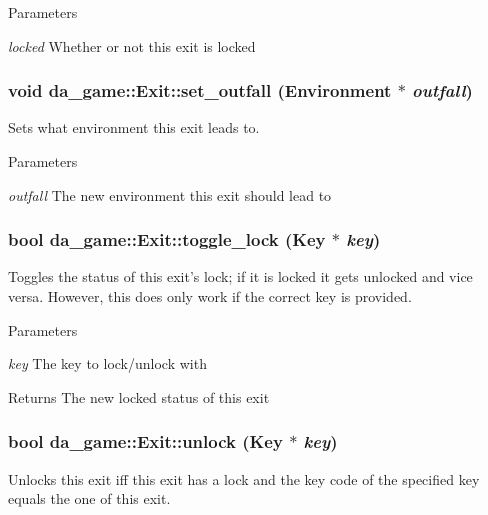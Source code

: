 \begin{DoxyParams}{Parameters}
\item[{\em locked}]Whether or not this exit is locked \end{DoxyParams}
\hypertarget{classda__game_1_1Exit_ae4f9caa0ac7bf7e09ae1b32fd3f10719}{
\subsubsection[{set\_\-outfall}]{\setlength{\rightskip}{0pt plus 5cm}void da\_\-game::Exit::set\_\-outfall ({\bf Environment} $\ast$ {\em outfall})}}
\label{classda__game_1_1Exit_ae4f9caa0ac7bf7e09ae1b32fd3f10719}
Sets what environment this exit leads to.


\begin{DoxyParams}{Parameters}
\item[{\em outfall}]The new environment this exit should lead to \end{DoxyParams}
\hypertarget{classda__game_1_1Exit_a36b7a9235fcb00bf2be0b3fbc5817310}{
\subsubsection[{toggle\_\-lock}]{\setlength{\rightskip}{0pt plus 5cm}bool da\_\-game::Exit::toggle\_\-lock ({\bf Key} $\ast$ {\em key})}}
\label{classda__game_1_1Exit_a36b7a9235fcb00bf2be0b3fbc5817310}
Toggles the status of this exit's lock; if it is locked it gets unlocked and vice versa. However, this does only work if the correct key is provided.


\begin{DoxyParams}{Parameters}
\item[{\em key}]The key to lock/unlock with \end{DoxyParams}
\begin{DoxyReturn}{Returns}
The new locked status of this exit 
\end{DoxyReturn}
\hypertarget{classda__game_1_1Exit_a4e770f624717bb87b2ebd372eb71a09c}{
\subsubsection[{unlock}]{\setlength{\rightskip}{0pt plus 5cm}bool da\_\-game::Exit::unlock ({\bf Key} $\ast$ {\em key})}}
\label{classda__game_1_1Exit_a4e770f624717bb87b2ebd372eb71a09c}
Unlocks this exit iff this exit has a lock and the key code of the specified key equals the one of this exit.


